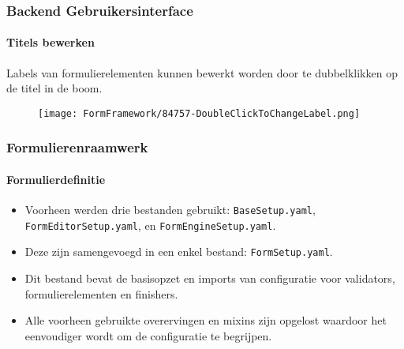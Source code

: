
\begin{frame}[fragile]
	\frametitle{Backend Gebruikersinterface}
	\framesubtitle{Titels bewerken}

	Labels van formulierelementen kunnen bewerkt worden door te dubbelklikken op de titel in de boom.

	\begin{figure}
		\texttt{[image: FormFramework/84757-DoubleClickToChangeLabel.png]}
	\end{figure}

\end{frame}


\begin{frame}[fragile]
	\frametitle{Formulierenraamwerk}
	\framesubtitle{Formulierdefinitie}

	\begin{itemize}
		\item Voorheen werden drie bestanden gebruikt: \texttt{BaseSetup.yaml}, \texttt{FormEditorSetup.yaml}, en \texttt{FormEngineSetup.yaml}.
		\item Deze zijn samengevoegd in een enkel bestand: \texttt{FormSetup.yaml}.
		\item Dit bestand bevat de basisopzet en imports van configuratie voor validators, formulierelementen en finishers.
		\item Alle voorheen gebruikte overervingen en mixins zijn opgelost waardoor het eenvoudiger wordt om de configuratie te begrijpen.
	\end{itemize}

\end{frame}



